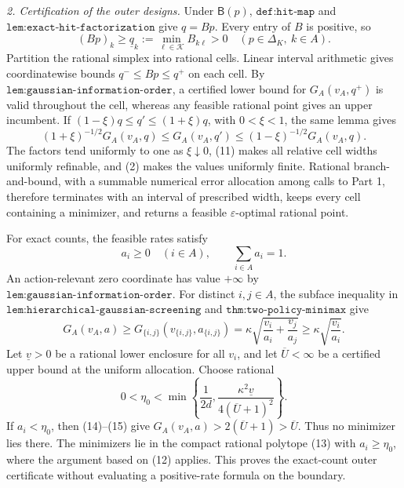 \emph{2. Certification of the outer designs.}
Under \(\mathsf B(p)\), \(\texttt{def:hit-map}\) and \(\texttt{lem:exact-hit-factorization}\) give \(q=Bp\).  Every entry of \(B\) is positive, so
\[
(Bp)_k\geq\underline q_k:=\min_{\ell\in\mathcal K}B_{k\ell}>0
\quad(p\in\Delta_K,\ k\in A).                                   \tag{11}
\]
Partition the rational simplex into rational cells.  Linear interval arithmetic gives coordinatewise bounds \(q^-\leq Bp\leq q^+\) on each cell.  By \(\texttt{lem:gaussian-information-order}\), a certified lower bound for \(G_A(v_A,q^+)\) is valid throughout the cell, whereas any feasible rational point gives an upper incumbent.  If \((1-\xi)q\leq q'\leq(1+\xi)q\), with \(0<\xi<1\), the same lemma gives
\[
(1+\xi)^{-1/2}G_A(v_A,q)
\leq G_A(v_A,q')
\leq(1-\xi)^{-1/2}G_A(v_A,q).                                    \tag{12}
\]
The factors tend uniformly to one as \(\xi\downarrow0\), (11) makes all relative cell widths uniformly refinable, and (2) makes the values uniformly finite.  Rational branch-and-bound, with a summable numerical error allocation among calls to Part 1, therefore terminates with an interval of prescribed width, keeps every cell containing a minimizer, and returns a feasible \(\varepsilon\)-optimal rational point.

For exact counts, the feasible rates satisfy
\[
a_i\geq0\quad(i\in A),\qquad\sum_{i\in A}a_i=1.                 \tag{13}
\]
An action-relevant zero coordinate has value \(+\infty\) by \(\texttt{lem:gaussian-information-order}\).  For distinct \(i,j\in A\), the subface inequality in \(\texttt{lem:hierarchical-gaussian-screening}\) and \(\texttt{thm:two-policy-minimax}\) give
\[
G_A(v_A,a)\geq G_{\{i,j\}}(v_{\{i,j\}},a_{\{i,j\}})
=\kappa\sqrt{\frac{v_i}{a_i}+\frac{v_j}{a_j}}
\geq\kappa\sqrt{\frac{v_i}{a_i}}.                               \tag{14}
\]
Let \(\underline v>0\) be a rational lower enclosure for all \(v_i\), and let \(\overline U<\infty\) be a certified upper bound at the uniform allocation.  Choose rational
\[
0<\eta_0<\min\left\{\frac1{2d},
\frac{\kappa^2\underline v}{4(\overline U+1)^2}\right\}.         \tag{15}
\]
If \(a_i<\eta_0\), then (14)--(15) give \(G_A(v_A,a)>2(\overline U+1)>\overline U\).  Thus no minimizer lies there.  The minimizers lie in the compact rational polytope (13) with \(a_i\geq\eta_0\), where the argument based on (12) applies.  This proves the exact-count outer certificate without evaluating a positive-rate formula on the boundary.

